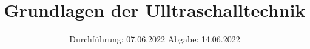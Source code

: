

\subject{US1}
\title{Grundlagen der Ulltraschalltechnik}
\date{
  Durchführung: 07.06.2022
  \hspace{3em}
  Abgabe: 14.06.2022
}



\maketitle
\thispagestyle{empty}
\tableofcontents
\newpage









